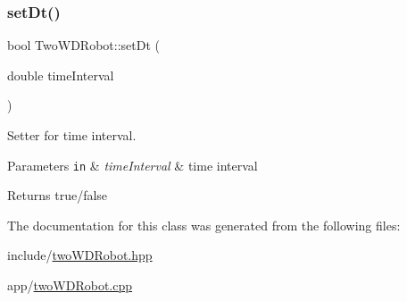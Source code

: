 \subsubsection{\texorpdfstring{set\+Dt()}{setDt()}}
{\footnotesize\ttfamily bool Two\+W\+D\+Robot\+::set\+Dt (\begin{DoxyParamCaption}\item[{double}]{time\+Interval }\end{DoxyParamCaption})}



Setter for time interval. 


\begin{DoxyParams}[1]{Parameters}
\mbox{\tt in}  & {\em time\+Interval} & time interval \\
\hline
\end{DoxyParams}
\begin{DoxyReturn}{Returns}
true/false 
\end{DoxyReturn}


The documentation for this class was generated from the following files\+:\begin{DoxyCompactItemize}
\item 
include/\hyperlink{twoWDRobot_8hpp}{two\+W\+D\+Robot.\+hpp}\item 
app/\hyperlink{twoWDRobot_8cpp}{two\+W\+D\+Robot.\+cpp}\end{DoxyCompactItemize}
